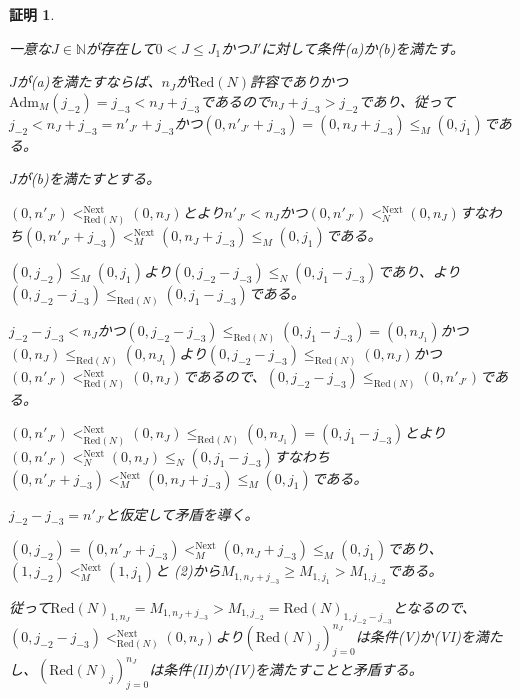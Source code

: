 \documentclass[dvipdfmx,uplatex]{jsarticle}
\theoremstyle{customnonumberbreakfortheorem}
\theoremstyle{customnonumberbreakforproof}
\newtheorem{hideableproof}{証明}
\begin{document}
\begin{hideableproof}
\begin{indented}
\begin{indented}
			\item 一意な\(J \in \mathbb{N}\)が存在して\(0 < J \leq J_1\)かつ\(J'\)に対して条件(a)か(b)を満たす。
			\item \(J\)が(a)を満たすならば、\(n_J\)が\(\textrm{Red}(N)\)許容でありかつ\(\textrm{Adm}_M(j_{-2}) = j_{-3} < n_J+j_{-3}\)であるので\(n_J+j_{-3} > j_{-2}\)であり、従って\(j_{-2} < n_J+j_{-3} = n'_{J'}+j_{-3}\)かつ\((0,n'_{J'}+j_{-3}) = (0,n_J+j_{-3}) \leq_M (0,j_1)\)である。
			\item \(J\)が(b)を満たすとする。
			\begin{indented}
				\item \((0,n'_{J'}) <_{\textrm{Red}(N)}^{\textrm{Next}} (0,n_J)\)とより\(n'_{J'} < n_J\)かつ\((0,n'_{J'}) <_N^{\textrm{Next}} (0,n_J)\)すなわち\((0,n'_{J'}+j_{-3}) <_M^{\textrm{Next}} (0,n_J+j_{-3}) \leq_M (0,j_1)\)である。
				\item \((0,j_{-2}) \leq_M (0,j_1)\)より\((0,j_{-2}-j_{-3}) \leq_N (0,j_1-j_{-3})\)であり、より\((0,j_{-2}-j_{-3}) \leq_{\textrm{Red}(N)} (0,j_1-j_{-3})\)である。
				\item \(j_{-2}-j_{-3} < n_J\)かつ\((0,j_{-2}-j_{-3}) \leq_{\textrm{Red}(N)} (0,j_1-j_{-3}) = (0,n_{J_1})\)かつ\((0,n_J) \leq_{\textrm{Red}(N)} (0,n_{J_1})\)より\((0,j_{-2}-j_{-3}) \leq_{\textrm{Red}(N)} (0,n_J)\)かつ\((0,n'_{J'}) <_{\textrm{Red}(N)}^{\textrm{Next}} (0,n_J)\)であるので、\((0,j_{-2}-j_{-3}) \leq_{\textrm{Red}(N)} (0,n'_{J'})\)である。
				\item \((0,n'_{J'}) <_{\textrm{Red}(N)}^{\textrm{Next}} (0,n_J) \leq_{\textrm{Red}(N)} (0,n_{J_1}) = (0,j_1-j_{-3})\)とより\((0,n'_{J'}) <_N^{\textrm{Next}} (0,n_J) \leq_N (0,j_1-j_{-3})\)すなわち\((0,n'_{J'}+j_{-3}) <_M^{\textrm{Next}} (0,n_J+j_{-3}) \leq_M (0,j_1)\)である。
				\item \(j_{-2}-j_{-3} = n'_{J'}\)と仮定して矛盾を導く。
				\begin{indented}
					\item \((0,j_{-2}) = (0,n'_{J'}+j_{-3}) <_M^{\textrm{Next}} (0,n_J+j_{-3}) \leq_M (0,j_1)\)であり、\((1,j_{-2}) <_M^{\textrm{Next}} (1,j_1)\)と (2)から\(M_{1,n_J+j_{-3}} \geq M_{1,j_1} > M_{1,j_{-2}}\)である。
					\item 従って\(\textrm{Red}(N)_{1,n_J} = M_{1,n_J+j_{-3}} > M_{1,j_{-2}} = \textrm{Red}(N)_{1,j_{-2}-j_{-3}}\)となるので、\((0,j_{-2}-j_{-3}) <_{\textrm{Red}(N)}^{\textrm{Next}} (0,n_J)\)より\((\textrm{Red}(N)_j)_{j=0}^{n_J}\)は条件(V)か(VI)を満たし、\((\textrm{Red}(N)_j)_{j=0}^{n_J}\)は条件(II)か(IV)を満たすことと矛盾する。

\end{indented}
\end{indented}
\end{indented}
\end{indented}
\end{hideableproof}
\end{document}
